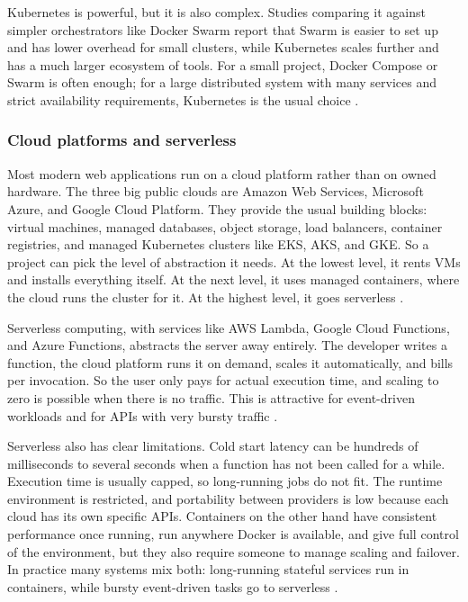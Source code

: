 Kubernetes is powerful, but it is also complex. Studies comparing it against simpler orchestrators like Docker Swarm report that Swarm is easier to set up and has lower overhead for small clusters, while Kubernetes scales further and has a much larger ecosystem of tools. For a small project, Docker Compose or Swarm is often enough; for a large distributed system with many services and strict availability requirements, Kubernetes is the usual choice \autocite{marella2024k8s_swarm, cochak2025k8s_docker}.

\subsubsection{Cloud platforms and serverless}
\label{sec:cloud-serverless}

Most modern web applications run on a cloud platform rather than on owned hardware. The three big public clouds are Amazon Web Services, Microsoft Azure, and Google Cloud Platform. They provide the usual building blocks: virtual machines, managed databases, object storage, load balancers, container registries, and managed Kubernetes clusters like EKS, AKS, and GKE. So a project can pick the level of abstraction it needs. At the lowest level, it rents VMs and installs everything itself. At the next level, it uses managed containers, where the cloud runs the cluster for it. At the highest level, it goes serverless \autocite{galhotra2025containerization, kotakonda2026k8s_ecs}.

Serverless computing, with services like AWS Lambda, Google Cloud Functions, and Azure Functions, abstracts the server away entirely. The developer writes a function, the cloud platform runs it on demand, scales it automatically, and bills per invocation. So the user only pays for actual execution time, and scaling to zero is possible when there is no traffic. This is attractive for event-driven workloads and for APIs with very bursty traffic \autocite{ponnaganti2025mlops, serverless_vs_containers_alibaba_2023}.

Serverless also has clear limitations. Cold start latency can be hundreds of milliseconds to several seconds when a function has not been called for a while. Execution time is usually capped, so long-running jobs do not fit. The runtime environment is restricted, and portability between providers is low because each cloud has its own specific APIs. Containers on the other hand have consistent performance once running, run anywhere Docker is available, and give full control of the environment, but they also require someone to manage scaling and failover. In practice many systems mix both: long-running stateful services run in containers, while bursty event-driven tasks go to serverless \autocite{serverless_vs_containers_alibaba_2023, serverless_vs_containers_cloudoptimo_2025, serverless_vs_containers_datadog_2024}.

